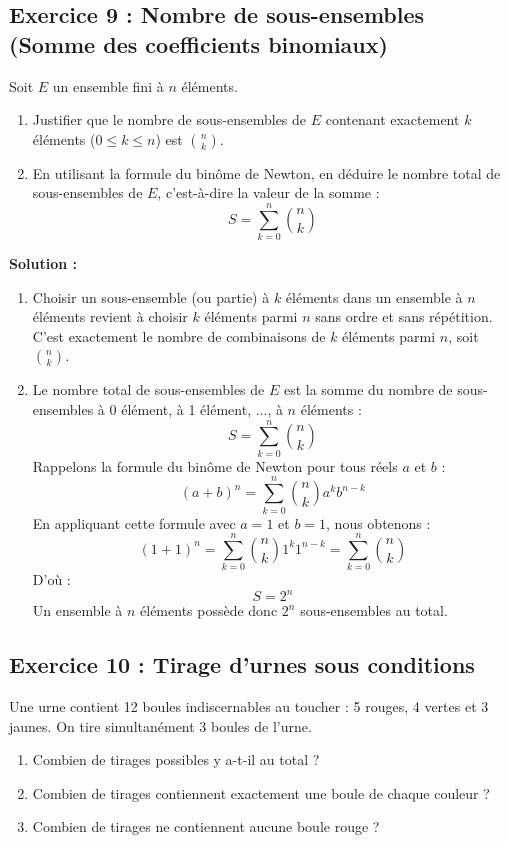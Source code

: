 \subsection*{Exercice 9 : Nombre de sous-ensembles (Somme des coefficients binomiaux)}
Soit $E$ un ensemble fini à $n$ éléments.
\begin{enumerate}
    \item Justifier que le nombre de sous-ensembles de $E$ contenant exactement $k$ éléments ($0 \le k \le n$) est $\binom{n}{k}$.
    \item En utilisant la formule du binôme de Newton, en déduire le nombre total de sous-ensembles de $E$, c'est-à-dire la valeur de la somme :
    \[
    S = \sum_{k=0}^n \binom{n}{k}
    \]
\end{enumerate}

\textbf{Solution :}
\begin{enumerate}
    \item Choisir un sous-ensemble (ou partie) à $k$ éléments dans un ensemble à $n$ éléments revient à choisir $k$ éléments parmi $n$ sans ordre et sans répétition. C'est exactement le nombre de combinaisons de $k$ éléments parmi $n$, soit $\binom{n}{k}$.
    
    \item Le nombre total de sous-ensembles de $E$ est la somme du nombre de sous-ensembles à 0 élément, à 1 élément, ..., à $n$ éléments :
    \[
    S = \sum_{k=0}^n \binom{n}{k}
    \]
    Rappelons la formule du binôme de Newton pour tous réels $a$ et $b$ :
    \[
    (a+b)^n = \sum_{k=0}^n \binom{n}{k} a^k b^{n-k}
    \]
    En appliquant cette formule avec $a = 1$ et $b = 1$, nous obtenons :
    \[
    (1+1)^n = \sum_{k=0}^n \binom{n}{k} 1^k 1^{n-k} = \sum_{k=0}^n \binom{n}{k}
    \]
    D'où :
    \[
    S = 2^n
    \]
    Un ensemble à $n$ éléments possède donc $2^n$ sous-ensembles au total.
\end{enumerate}

\subsection*{Exercice 10 : Tirage d'urnes sous conditions}
Une urne contient 12 boules indiscernables au toucher : 5 rouges, 4 vertes et 3 jaunes. On tire simultanément 3 boules de l'urne.
\begin{enumerate}
    \item Combien de tirages possibles y a-t-il au total ?
    \item Combien de tirages contiennent exactement une boule de chaque couleur ?
    \item Combien de tirages ne contiennent aucune boule rouge ?
\end{enumerate}

